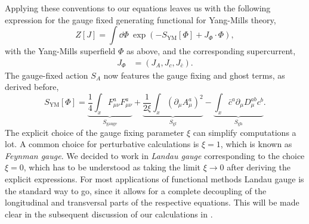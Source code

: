 Applying these conventions to our equations leaves us with the following expression for the gauge fixed generating functional for Yang-Mills theory,
\begin{equation}
Z\left[J\right]=\int \dd \Phi\ \exp\left(-S_{\mathrm{YM}}[\Phi]+J_{\Phi}\cdot \Phi\right),
\end{equation}
with the Yang-Mills superfield $\Phi$ as above, and the corresponding supercurrent, 
\begin{equation}
\begin{aligned}
J_{\Phi} &= (J_A, J_c, J_{\bar{c}}).
\end{aligned}
\end{equation}
The gauge-fixed action $S_A$ now features the  gauge fixing and ghost terms, as derived before, 
\begin{equation}
S_{\mathrm{YM}}[\Phi]=\underbrace{\frac{1}{4} \int_{x} F_{\mu \nu}^{a} F_{\mu \nu}^{a}}_{S_{\mathrm{gauge}}}+\underbrace{\frac{1}{2 \xi} \int_{x}\left(\partial_{\mu} A_{\mu}^{a}\right)^{2}}_{S_{\mathrm{gf}}}-\underbrace{\int_{x} \bar{c}^{a} \partial_{\mu} D_{\mu}^{a b} c^{b}}_{S_{\mathrm{gh}}}.
\end{equation}
The explicit choice of the gauge fixing parameter $\xi$ can simplify computations a lot. A common choice for perturbative calculations is $\xi=1$, which is known as \textit{Feynman gauge}. We decided to work in \textit{Landau gauge} corresponding to the choice $\xi=0$, which has to be understood as taking the limit $\xi\rightarrow 0$ after deriving the explicit expressions. For most applications of functional methods Landau gauge is the standard way to go, since it allows for a complete decoupling of the longitudinal and transversal parts  of the respective equations. This will be made clear in the subsequent discussion of our calculations in .
 

